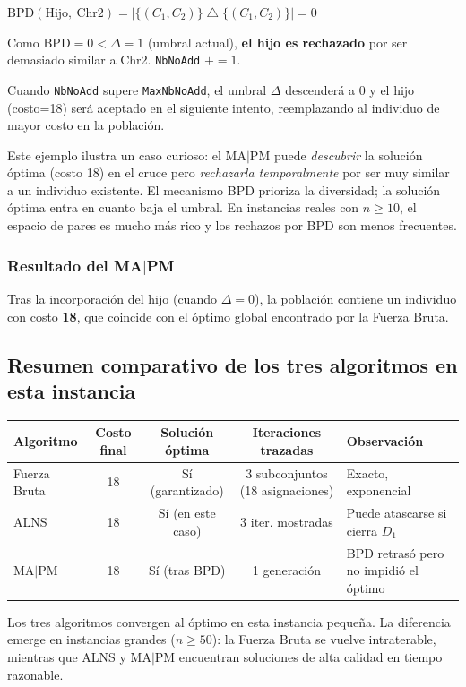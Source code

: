 \documentclass[12pt,a4paper]{article}
\begin{document}
$\text{BPD}(\text{Hijo},\ \text{Chr2}) = |\{(C_1,C_2)\} \;\triangle\; \{(C_1,C_2)\}| = 0$

Como $\text{BPD}=0 < \Delta=1$ (umbral actual), \textbf{el hijo es rechazado} por ser demasiado similar a Chr2.
\texttt{NbNoAdd} $\mathrel{+}= 1$.

Cuando \texttt{NbNoAdd} supere \texttt{MaxNbNoAdd}, el umbral $\Delta$ descenderá a 0 y el hijo (costo=18) será aceptado en el siguiente intento, reemplazando al individuo de mayor costo en la población.

\begin{nota}
Este ejemplo ilustra un caso curioso: el MA$|$PM puede \textit{descubrir} la solución óptima (costo 18) en el cruce pero \textit{rechazarla temporalmente} por ser muy similar a un individuo existente. El mecanismo BPD prioriza la diversidad; la solución óptima entra en cuanto baja el umbral. En instancias reales con $n \geq 10$, el espacio de pares es mucho más rico y los rechazos por BPD son menos frecuentes.
\end{nota}

\subsubsection*{Resultado del MA$|$PM}

Tras la incorporación del hijo (cuando $\Delta=0$), la población contiene un individuo con costo \textbf{18}, que coincide con el óptimo global encontrado por la Fuerza Bruta.

\subsection*{Resumen comparativo de los tres algoritmos en esta instancia}

\begin{center}
\begin{tabular}{lcccl}
\toprule
Algoritmo & Costo final & Solución óptima & Iteraciones trazadas & Observación \\
\midrule
Fuerza Bruta & 18 & Sí (garantizado) & 3 subconjuntos (18 asignaciones) & Exacto, exponencial \\
ALNS         & 18 & Sí (en este caso)& 3 iter. mostradas   & Puede atascarse si cierra $D_1$ \\
MA$|$PM      & 18 & Sí (tras BPD)    & 1 generación         & BPD retrasó pero no impidió el óptimo \\
\bottomrule
\end{tabular}
\end{center}

Los tres algoritmos convergen al óptimo en esta instancia pequeña.
La diferencia emerge en instancias grandes ($n \geq 50$): la Fuerza Bruta se vuelve intraterable, mientras que ALNS y MA$|$PM encuentran soluciones de alta calidad en tiempo razonable.
\end{document}
